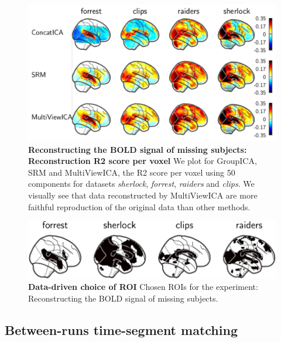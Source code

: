\documentclass{report}
\begin{document}
\begin{figure}
  \centering
  \includegraphics[width=\textwidth]{figures/mvica/reconstruction_score_fullbrain.pdf}
  \caption{\textbf{Reconstructing the BOLD signal of missing subjects: Reconstruction R2 score per voxel} We plot for GroupICA, SRM and MultiViewICA, the R2 score per voxel using 50 components for datasets \emph{sherlock}, \emph{forrest}, \emph{raiders} and \emph{clips}. We visually see that data reconstructed by MultiViewICA are more faithful reproduction of the original data than other methods.}
  \label{fig:brainmaps}
\end{figure}

\begin{figure}
  \centering
  \includegraphics[width=\textwidth]{figures/mvica/reconstruction_score_roi.pdf}
  \caption{\textbf{Data-driven choice of ROI} Chosen ROIs for the experiment: Reconstructing the BOLD signal of missing subjects.}
  \label{fig:roi}
\end{figure}

\subsection{Between-runs time-segment matching}
\label{app_spatialmaps}
\end{document}
